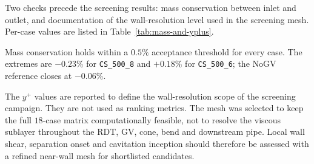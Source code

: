 Two checks precede the screening results: mass conservation between inlet and outlet, and documentation of the wall-resolution level used in the screening mesh. Per-case values are listed in Table~\ref{tab:mass-and-yplus}.

Mass conservation holds within a \(0.5\%\) acceptance threshold for every case. The extremes are \(-0.23\%\) for \texttt{CS\_500\_8} and \(+0.18\%\) for \texttt{CS\_500\_6}; the NoGV reference closes at \(-0.06\%\).

The \(y^+\) values are reported to define the wall-resolution scope of the screening campaign. They are not used as ranking metrics. The mesh was selected to keep the full \(18\)-case matrix computationally feasible, not to resolve the viscous sublayer throughout the RDT, GV, cone, bend and downstream pipe. Local wall shear, separation onset and cavitation inception should therefore be assessed with a refined near-wall mesh for shortlisted candidates.

